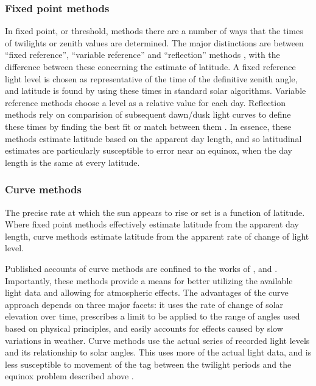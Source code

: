 \documentclass[10pt]{article}
\begin{document}
\subsubsection{Fixed point methods }
In fixed point, or threshold, methods there are a number of ways that
the times of twilights or zenith values are determined.  The major
distinctions are between ``fixed reference'', ``variable reference''
and ``reflection'' methods \cite{M01}, with the difference between
these concerning the estimate of latitude.  A fixed reference light
level is chosen as representative of the time of the definitive zenith
angle, and latitude is found by using these times in standard solar
algorithms.  Variable reference methods choose a level as a relative
value for each day. Reflection methods rely on comparision of
subsequent dawn/dusk light curves to define these times by finding the
best fit or match between them \cite{Hill2003}.  In essence, these
methods estimate latitude based on the apparent day length, and so
latitudinal estimates are particularly susceptible to error near an
equinox, when the day length is the same at every latitude.

\subsubsection{Curve methods}
The precise rate at which the sun appears to rise or set is a function
of latitude.  Where fixed point methods effectively estimate latitude
from the apparent day length, curve methods estimate latitude from the
apparent rate of change of light level.

Published accounts of curve methods are confined to the works of
\cite{Ekstrom}, \cite{MBCG01} and \cite{sibert2007sml}. Importantly,
these methods provide a means for better utilizing the available light
data and allowing for atmospheric effects. The advantages of the curve
approach depends on three major facets: it uses the rate of change of
solar elevation over time, prescribes a limit to be applied to the
range of angles used based on physical principles, and easily accounts
for effects caused by slow variations in weather.  Curve methods use
the actual series of recorded light levels and its relationship to
solar angles.  This uses more of the actual light data, and is less
susceptible to movement of the tag between the twilight periods and
the equinox problem described above \cite{Ekstrom}.
\end{document}
